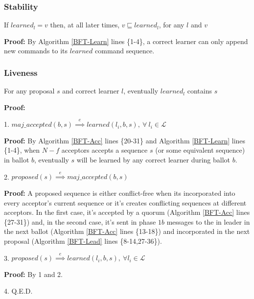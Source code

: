 \subsubsection{Stability}
\begin{theorem}
If $learned_l = v$ then, at all later times, $v \sqsubseteq learned_l$, for any $l$ and $v$ \par \label{S-T1}
\end{theorem} 
\textbf{Proof:} By Algorithm \ref{BFT-Learn} lines \{1-4\}, a correct learner can only append new commands to its $learned$ command sequence.

\subsubsection{Liveness}
\begin{theorem}
For any proposal $s$ and correct learner $l$, eventually $learned_l$ contains $s$ \label{L-T1} \par
\end{theorem} 
\textbf{Proof:} \par
1. $maj\_accepted(b,s) \overset{e}{\implies} learned(l_i,b,s),\ \forall\ l_i \in \mathcal{L}$ \par
\indent\indent\parbox{\linewidth}{\textbf{Proof:} By Algorithm \ref{BFT-Acc} lines \{20-31\} and Algorithm \ref{BFT-Learn} lines \{1-4\}, when $N-f$ acceptors accepts a sequence $s$ (or some equivalent sequence) in ballot $b$, eventually $s$ will be learned by any correct learner during ballot $b$.}\par
2. $proposed(s) \overset{e}{\implies} maj\_accepted(b,s)$ \par
\indent\indent\parbox{\linewidth}{\textbf{Proof:} A proposed sequence is either conflict-free when its incorporated into every acceptor's current sequence or it's creates conflicting sequences at different acceptors. In the first case, it's accepted by a quorum (Algorithm \ref{BFT-Acc} lines \{27-31\}) and, in the second case, it's sent in phase $1b$ messages to the in leader in the next ballot (Algorithm \ref{BFT-Acc} lines \{13-18\}) and incorporated in the next proposal (Algorithm \ref{BFT-Lead} lines \{8-14,27-36\}).} \par
3. $proposed(s) \overset{e}{\implies} learned(l_i,b,s),\ \forall l_i \in \mathcal{L}$ \par
\indent\indent\textbf{Proof:} By 1 and 2. \par
4. Q.E.D.